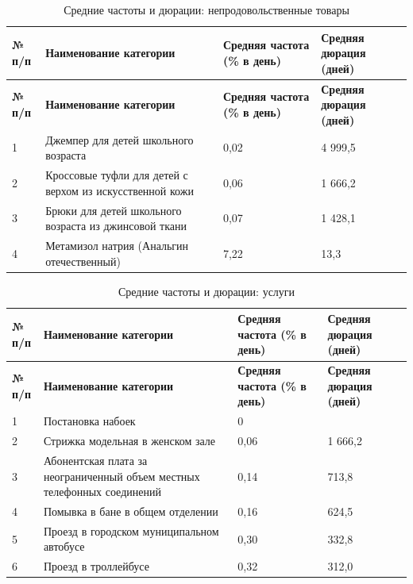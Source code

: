 \begin{longtable}{|p{1cm}|p{8.5cm}|p{3.5cm}|p{3cm}|} %
	\caption{Средние частоты и дюрации: непродовольственные товары}
	\label{tab:non_food_products} \\
	\hline
	\textbf{№ п/п} & \textbf{Наименование категории} & \textbf{Средняя частота (\% в день)} & \textbf{Средняя дюрация (дней)} \\
	\hline
	\hline
	\endfirsthead
	
	\hline
	\textbf{№ п/п} & \textbf{Наименование категории} & \textbf{Средняя частота (\% в день)} & \textbf{Средняя дюрация (дней)} \\
	\hline
	\hline
	\endhead
	
	\hline
	\endfoot
	
	\hline
	\endlastfoot
	
	1 & Джемпер для детей школьного возраста & 0,02 & 4 999,5 \\ \hline
	2 & Кроссовые туфли для детей с верхом из искусственной кожи & 0,06 & 1 666,2 \\ \hline
	3 & Брюки для детей школьного возраста из джинсовой ткани & 0,07 & 1 428,1 \\ \hline
	4 & Метамизол натрия (Анальгин отечественный) & 7,22 & 13,3 \\ \hline
	
\end{longtable}
\noindent
{}


\begin{longtable}{|p{1cm}|p{8.5cm}|p{3.5cm}|p{3cm}|} %
	\caption{Средние частоты и дюрации: услуги}
	\label{tab:services} \\
	\hline
	\textbf{№ п/п} & \textbf{Наименование категории} & \textbf{Средняя частота (\% в день)} & \textbf{Средняя дюрация (дней)} \\
	\hline
	\hline
	\endfirsthead
	
	\hline
	\textbf{№ п/п} & \textbf{Наименование категории} & \textbf{Средняя частота (\% в день)} & \textbf{Средняя дюрация (дней)} \\
	\hline
	\hline
	\endhead
	
	\hline
	\endfoot
	
	\hline
	\endlastfoot
	
	1 & Постановка набоек & 0 &  \\ \hline
	2 & Стрижка модельная в женском зале & 0,06 & 1 666,2 \\ \hline
	3 & Абонентская плата за неограниченный объем местных телефонных соединений & 0,14 & 713,8 \\ \hline
	4 & Помывка в бане в общем отделении & 0,16 & 624,5 \\ \hline
	5 & Проезд в городском муниципальном автобусе & 0,30 & 332,8 \\ \hline
	6 & Проезд в троллейбусе & 0,32 & 312,0 \\ \hline
	
\end{longtable}
\noindent
{}




